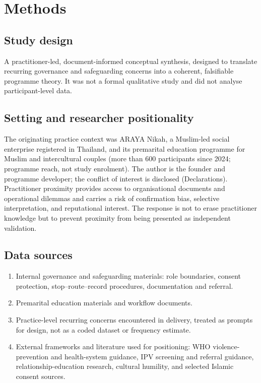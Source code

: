 \documentclass[10pt,twocolumn]{article}
\begin{document}
\section{Methods}

\subsection{Study design}
A practitioner-led, document-informed conceptual synthesis, designed to translate recurring governance and safeguarding concerns into a coherent, falsifiable programme theory. It was not a formal qualitative study and did not analyse participant-level data.

\subsection{Setting and researcher positionality}
The originating practice context was ARAYA Nikah, a Muslim-led social enterprise registered in Thailand, and its premarital education programme for Muslim and intercultural couples (more than 600 participants since 2024; programme reach, not study enrolment). The author is the founder and programme developer; the conflict of interest is disclosed (Declarations). Practitioner proximity provides access to organisational documents and operational dilemmas and carries a risk of confirmation bias, selective interpretation, and reputational interest. The response is not to erase practitioner knowledge but to prevent proximity from being presented as independent validation.

\subsection{Data sources}
\begin{enumerate}
\item Internal governance and safeguarding materials: role boundaries, consent protection, stop--route--record procedures, documentation and referral.
\item Premarital education materials and workflow documents.
\item Practice-level recurring concerns encountered in delivery, treated as prompts for design, not as a coded dataset or frequency estimate.
\item External frameworks and literature used for positioning: WHO violence-prevention and health-system guidance, IPV screening and referral guidance, relationship-education research, cultural humility, and selected Islamic consent sources.
\end{enumerate}
\end{document}
